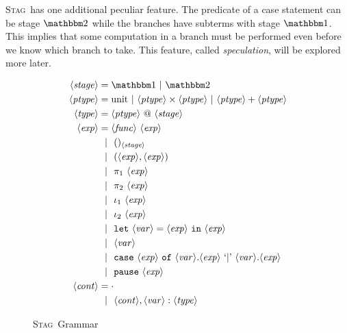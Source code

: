 \documentclass[11pt]{article}
\makeatletter
\newcommand {\stage} {\langle\mathit{stage}\rangle}
\newcommand {\ptype} {\langle\mathit{ptype}\rangle}
\newcommand {\type} {\langle\mathit{type}\rangle}
\newcommand {\expr} {\langle\mathit{exp}\rangle}
\newcommand {\var} {\langle\mathit{var}\rangle}
\newcommand {\context} {\langle\mathit{cont}\rangle}
\newcommand {\gbar} {~~|~~}
\newcommand {\bbone} {\mathbbm 1}
\newcommand {\bbtwo} {\mathbbm 2}
\newcommand {\at} {{\tt~@~}}
\newcommand {\pause} {{\tt pause}}
\newcommand {\letin} [3] {{\tt let}~{#1} = {#2}~{\tt in}~{#3}}
\newcommand {\wstage} {\textsc{Stag}}
\makeatother
\begin{document}
\wstage~has one additional peculiar feature.  The predicate of a case statement can be stage $\bbtwo$ while the branches have subterms with stage $\bbone$.  This implies that some computation in a branch must be performed even before we know which branch to take.  This feature, called {\it speculation}, will be explored more later.

\begin{figure}
\caption{\wstage~Grammar}
\label{fig:gram}
\centering
\begin{align*}
\stage &= \bbone~|~\bbtwo \\
\ptype &= \text{unit}~|~\ptype \times \ptype~|~\ptype + \ptype \\
\type &= \ptype \at \stage \\
\expr &= \langle\mathit{func}\rangle~\expr \\
&\gbar ()_{\stage} \\
&\gbar (\expr, \expr) \\
&\gbar \pi_1~\expr \\
&\gbar \pi_2~\expr \\
&\gbar \iota_1~\expr \\
&\gbar \iota_2~\expr \\
&\gbar \letin {\var}{\expr}{\expr} \\
&\gbar \var \\
&\gbar {\tt case}~\expr~{\tt of}~\var.\expr~`{\tt |}\text{'}~\var.\expr \\
&\gbar \pause~\expr \\
\context &= \cdot \\
&\gbar \context, \var : \type
\end{align*}
\end{figure}
\end{document}
